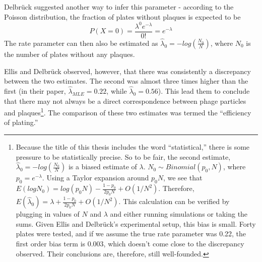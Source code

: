 \documentclass[12pt,twoside]{mitthesis-manusdown}
\begin{document}
Delbrück suggested another way to infer this parameter - according to
the Poisson distribution, the fraction of plates without plaques is
expected to be
\[P( X = 0 ) = \frac{ \lambda^0 e^{-\lambda} }{ 0! } = e^{-\lambda}\]
The rate parameter can then also be estimated as
\(\hat{\lambda}_0 = -log(\frac{N_0}{N})\), where \(N_0\) is the number
of plates without any plaques.

Ellis and Delbrück observed, however, that there was consistently a
discrepancy between the two estimates. The second was almost three times
higher than the first (in their paper, \(\hat{\lambda}_{MLE} = 0.22\),
while \(\hat{\lambda}_0 = 0.56\)). This lead them to conclude that there
may not always be a direct correspondence between phage particles and
plaques\footnote{Because the title of this thesis includes the word
  ``statistical,'' there is some pressure to be statistically precise.
  So to be fair, the second estimate,
  \(\hat{\lambda}_0 = -log(\frac{N_0}{N})\) is a biased estimate of
  \(\lambda\). \(N_0 \sim Binomial(p_0, N)\), where
  \(p_0 = e^{-\lambda}\). Using a Taylor expansion around \(p_0 N\), we
  see that
  \(E(log N_0) = log(p_0 N) - \frac{1-p_0}{2p_0 N} + O(1/N^2)\).
  Therefore,
  \(E(\hat{\lambda}_0) = \lambda +\frac{1-p_0}{2p_0 N}+O(1/N^2)\). This
  calculation can be verified by plugging in values of \(N\) and
  \(\lambda\) and either running simulations or taking the sums. Given
  Ellis and Delbrück's experimental setup, this bias is small. Forty
  plates were tested, and if we assume the true rate parameter was 0.22,
  the first order bias term is 0.003, which doesn't come close to the
  discrepancy observed. Their conclusions are, therefore, still
  well-founded.}. The comparison of these two estimates was termed the
``efficiency of plating.''
\end{document}
